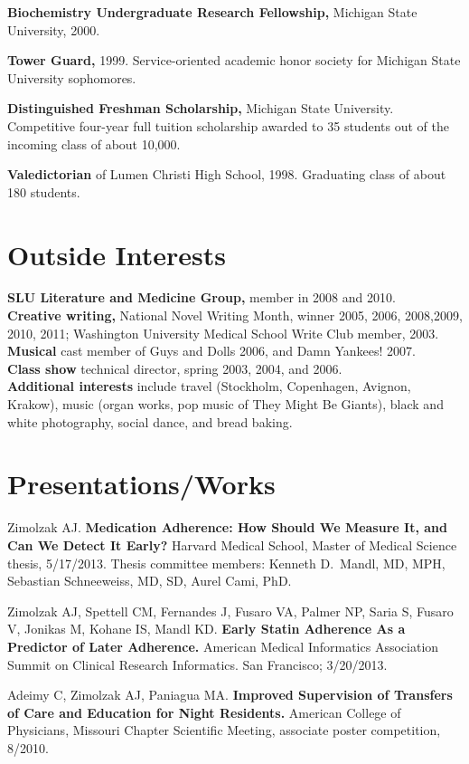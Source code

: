 \documentclass[12pt]{article}
\begin{document}
\textbf{Biochemistry Undergraduate Research Fellowship,} Michigan State
University, 2000.

\textbf{Tower Guard,} 1999. Service-oriented academic honor
society for Michigan State University sophomores.

\textbf{Distinguished Freshman Scholarship,} Michigan State
University. Competitive four-year full tuition scholarship awarded to
35 students out of the incoming class of about 10,000.

\textbf{Valedictorian} of Lumen Christi High School, 1998. Graduating
class of about 180 students.

\section*{Outside Interests}

\textbf{SLU Literature and Medicine Group,} member in 2008 and 2010.\\
\textbf{Creative writing,} National Novel Writing Month, winner 2005, 2006,
2008,2009, 2010, 2011; Washington University Medical School Write Club
member, 2003.\\
\textbf{Musical} cast member of Guys and Dolls 2006, and Damn Yankees! 2007.\\
\textbf{Class show} technical director, spring 2003, 2004, and 2006.\\
\textbf{Additional interests} include travel (Stockholm, Copenhagen, Avignon,
Krakow), music (organ works, pop music of They Might Be Giants), black
and white photography, social dance, and bread baking.

\section*{Presentations/Works}
Zimolzak AJ. \textbf{Medication Adherence: How Should We Measure It, and Can
We Detect It Early?} Harvard Medical School, Master of Medical Science
thesis, 5/17/2013. Thesis committee members: Kenneth D.\ Mandl, MD,
MPH, Sebastian Schneeweiss, MD, SD, Aurel Cami, PhD.

Zimolzak AJ, Spettell CM, Fernandes J, Fusaro VA, Palmer NP, Saria S,
Fusaro V, Jonikas M, Kohane IS, Mandl KD. \textbf{Early Statin
  Adherence As a Predictor of Later Adherence.} American Medical
Informatics Association Summit on Clinical Research Informatics. San
Francisco; 3/20/2013.

Adeimy C, Zimolzak AJ, Paniagua MA. \textbf{Improved Supervision of
  Transfers of Care and Education for Night Residents.} American
College of Physicians, Missouri Chapter Scientific Meeting, associate
poster competition, 8/2010.
\end{document}
